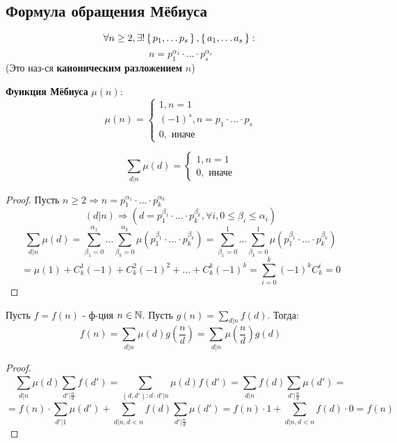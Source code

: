 \subsection{Формула обращения Мёбиуса}
\begin{theorem}[ОТА]
\[
\forall n \geq 2, \exists! \set{p_1, \ldots p_s}, \set{a_1, \ldots a_s} \colon
\]
\[
n = p_1^{\alpha_1} \cdot \ldots \cdot p_s^{\alpha_s}
\]
(Это наз-ся \textbf{каноническим разложением} $n$)
\end{theorem}
\begin{definition}
\textbf{Функция Мёбиуса} $\mu(n)\colon$
\[
\mu(n) = \begin{cases}
1, n = 1 \\
(-1)^{s}, n = p_1 \cdot \ldots \cdot p_s \\
0, \text{ иначе}
\end{cases}
\]
\end{definition}
\begin{lemma}
\[
\sum_{d | n}^{} \mu(d) = \begin{cases}
1, n = 1 \\
0, \text{ иначе}
\end{cases}
\]
\end{lemma}
\begin{proof}
Пусть $n \geq 2 \Rightarrow n = p_1^{\alpha_1} \cdot \ldots \cdot p_k^{\alpha_k}$ \\
\[
  (d | n) \Rightarrow (d = p_1^{\beta_1} \cdot \ldots \cdot p_k^{\beta_k}, \forall i, 0 \leq \beta_i \leq \alpha_i)
\]
\[
  \sum_{d | n}^{} \mu(d) = \sum_{\beta_1 = 0}^{\alpha_1} \ldots \sum_{\beta_k = 0}^{\alpha_k} \mu(p_1^{\beta_1} \cdot \ldots \cdot p_k^{\beta_k}) =\sum_{\beta_1 = 0}^{1} \ldots \sum_{\beta_k = 0}^{1} \mu(p_1^{\beta_1} \cdot \ldots \cdot p_k^{\beta_k})
\]
\[
 = \mu(1) + C_{k}^{1} (-1) + C_{k}^{2} (-1)^{2} + \ldots + C_{k}^{k}(-1)^{k} = \sum_{i = 0}^{k} (-1)^{k} C_{k}^{i} = 0
\]
\end{proof}
\begin{theorem}
Пусть $f = f(n)$ - ф-ция $n \in \mathbb{N}$. Пусть $g(n) = \sum_{d | n}^{} f(d)$. Тогда:
\[
f(n) = \sum_{d | n}^{} \mu(d) g\left(\frac{n}{d}\right) = \sum_{d | n}^{} \mu\left(\frac{n}{d}\right) g(d)
\]
\end{theorem}
\begin{proof}
\[
\sum_{d | n}^{} \mu(d) \sum_{d' | \frac{n}{d}}^{} f(d') = \sum_{(d, d') \colon d \cdot d' | n}^{} \mu(d)f(d') = \sum_{d | n}^{} f(d) \sum_{d' | \frac{n}{d}}^{} \mu(d') = 
\]
\[
= f(n) \cdot \sum_{d' | 1}^{} \mu(d') + \sum_{d | n, d < n}^{} f(d) \sum_{d' | \frac{n}{d}}^{} \mu(d') = f(n) \cdot 1 + \sum_{d | n, d < n}^{} f(d) \cdot 0 = f(n)
\]
\end{proof}
